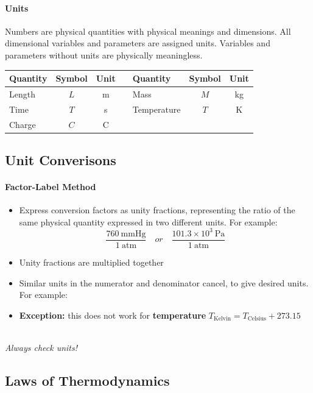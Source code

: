 \documentclass[12pt, a4paper]{article}
\begin{document}
\paragraph{Units} Numbers are physical quantities with physical meanings and dimensions. All dimensional variables and parameters are assigned units. Variables and parameters without units are physically meaningless.
\begin{tcolorbox}[title = 5 basic units used to describe all physical quantities]
\begin{center}
\begin{tabular}{lcc c lcc}
    \textbf{Quantity} & \textbf{Symbol} & \textbf{Unit} & & \textbf{Quantity} & \textbf{Symbol} & \textbf{Unit} \\
    \midrule
    Length & $L$ & m & & Mass & $M$ & kg \\
    Time & $T$ & s & & Temperature & $T$ & K \\
    Charge & $C$ & C & & & & \\
\end{tabular}
\end{center}
\end{tcolorbox}


\subsection{Unit Converisons}
\paragraph{Factor-Label Method}
\begin{itemize}
\item Express conversion factors as unity fractions, representing the ratio of the same physical quantity expressed in two different units. For example:
\[ \frac{760 \ \mathrm{mmHg}}{1 \ \mathrm{atm}} \quad or \quad \frac{101.3 \times 10^3 \ \mathrm{Pa}}{1 \ \mathrm{atm}} \]
\item Unity fractions are multiplied together
\item Similar units in the numerator and denominator cancel, to give desired units. For example:
\item \textbf{Exception:} this does not work for \textbf{temperature} $T_{\mathrm{Kelvin}} = T_{\mathrm{Celsius}} + 273.15$
\end{itemize}
\ \\
\textit{Always check units!}

\subsection{Laws of Thermodynamics}
\end{document}
